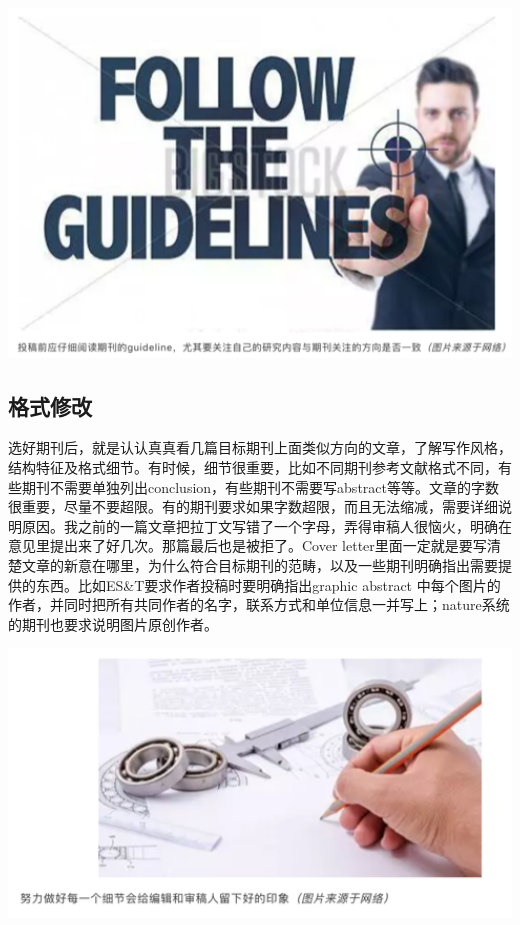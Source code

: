 \documentclass[]{book}
\begin{document}
\includegraphics[width=6.67in]{images/tougao2}

\hypertarget{ux683cux5f0fux4feeux6539}{%
\subsection{格式修改}\label{ux683cux5f0fux4feeux6539}}

选好期刊后，就是认认真真看几篇目标期刊上面类似方向的文章，了解写作风格，结构特征及格式细节。有时候，细节很重要，比如不同期刊参考文献格式不同，有些期刊不需要单独列出conclusion，有些期刊不需要写abstract等等。文章的字数很重要，尽量不要超限。有的期刊要求如果字数超限，而且无法缩减，需要详细说明原因。我之前的一篇文章把拉丁文写错了一个字母，弄得审稿人很恼火，明确在意见里提出来了好几次。那篇最后也是被拒了。Cover letter里面一定就是要写清楚文章的新意在哪里，为什么符合目标期刊的范畴，以及一些期刊明确指出需要提供的东西。比如ES\&T要求作者投稿时要明确指出graphic abstract 中每个图片的作者，并同时把所有共同作者的名字，联系方式和单位信息一并写上；nature系统的期刊也要求说明图片原创作者。

\includegraphics[width=6.67in]{images/tougao3}
\end{document}
